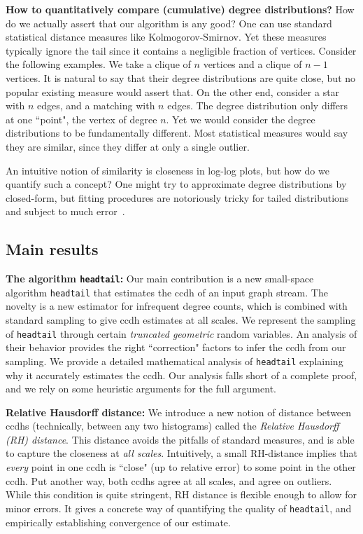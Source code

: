 \documentclass[11pt]{article}
\theoremstyle{definition}
\newcommand{\degdist}{{\tt headtail}}
\begin{document}
\textbf{How to quantitatively compare (cumulative) degree distributions?} How do we actually assert that our algorithm
is any good?
One can use standard statistical distance measures like Kolmogorov-Smirnov.
Yet these measures typically ignore
the tail since it contains a negligible fraction of vertices. Consider the following examples. We take a clique
of $n$ vertices and a clique of $n-1$ vertices. It is natural to say that their degree distributions are quite close,
but no popular existing measure would assert that. On the other end, consider a star with $n$ edges, and a matching with $n$
edges. The degree distribution only differs at one ``point", the vertex of degree $n$. Yet we would consider
the degree distributions to be fundamentally different. Most statistical measures would say they are similar, since
they differ at only a single outlier.

An intuitive notion of similarity is closeness in log-log plots, but how do we quantify such a concept? One might
try to approximate degree distributions by closed-form, but fitting procedures are notoriously tricky
for tailed distributions and subject to much error~\cite{ClShNe09}.

\subsection{Main results}


\textbf{The algorithm \degdist:} Our main contribution is a new small-space algorithm \degdist{} that estimates
the ccdh of an input graph stream. The novelty is a new estimator for infrequent
degree counts, which is combined with standard sampling to give
ccdh estimates at all scales. We represent the sampling of \degdist{} through certain \emph{truncated geometric}
random variables. An analysis of their behavior provides the right ``correction" factors
to infer the ccdh from our sampling.
We provide a detailed mathematical analysis of \degdist{} explaining why it accurately
estimates the ccdh. Our analysis falls short of a complete proof, and we rely
on some heuristic arguments for the full argument.

\textbf{Relative Hausdorff distance:} We introduce a new notion of distance between
ccdhs (technically, between any two histograms) called the \emph{Relative Hausdorff (RH) distance}.
This distance avoids the pitfalls of standard measures, and is able to capture the closeness
at \emph{all scales}. Intuitively, a small RH-distance implies that \emph{every} point in one ccdh
is ``close" (up to relative error) to some point in the other ccdh. Put another way, both ccdhs
agree at all scales, and agree on outliers. While this condition is quite stringent, RH distance
is flexible enough to allow for minor errors. It gives a concrete way of quantifying the quality
of \degdist, and empirically establishing convergence of our estimate.
\end{document}
